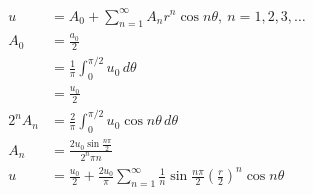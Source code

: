 \documentclass{article}
\begin{document}
\begin{align*}
  u                                                                & = A_0 + \sum_{n = 1}^\infty A_n r^n \cos n \theta,\ n = 1, 2, 3, \ldots                                                             \\
  A_0                                                              & = \frac{a_0}{2}                                                                                                                     \\
                                                                   & = \frac{1}{\pi} \int_0^{\pi / 2} u_0 \,d \theta                                                                                     \\
                                                                   & = \frac{u_0}{2}                                                                                                                     \\
  2^n A_n                                                          & = \frac{2}{\pi} \int_0^{\pi / 2} u_0 \cos n \theta \,d \theta                                                                       \\
  A_n                                                              & = \frac{2 u_0 \sin \frac{n \pi}{2}}{2^n \pi n}                                                                                      \\
  u                                                                & = \frac{u_0}{2} + \frac{2 u_0}{\pi} \sum_{n = 1}^\infty \frac{1}{n} \sin \frac{n \pi}{2} \left( \frac{r}{2} \right)^n \cos n \theta
\end{align*}

\setcounter{subsubsection}{8}
\subsubsection{}
\end{document}

